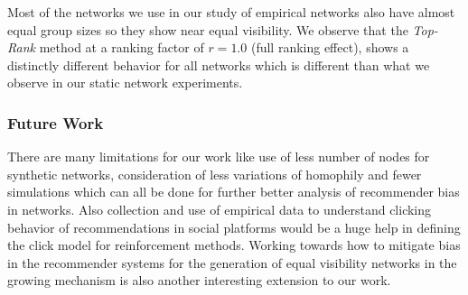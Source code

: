 Most of the networks we use in our study of empirical networks also have almost equal group sizes so they show near equal visibility. We observe that the \textit{Top-Rank} method at a ranking factor of $r=1.0$ (full ranking effect), shows a distinctly different behavior for all networks which is different than what we observe in our static network experiments.

\subsubsection{Future Work}
There are many limitations for our work like use of less number of nodes for synthetic networks, consideration of less variations of homophily and fewer simulations which can all be done for further better analysis of recommender bias in networks. Also collection and use of empirical data to understand clicking behavior of recommendations in social platforms would be a huge help in defining the click model for reinforcement methods. Working towards how to mitigate bias in the recommender systems for the generation of equal visibility networks in the growing mechanism is also another interesting extension to our work.